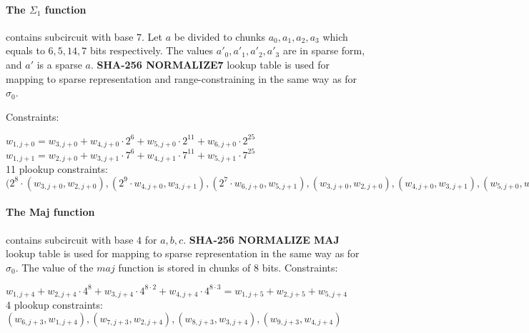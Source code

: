 \paragraph{The $\Sigma_1$ function}
contains subcircuit with base $7$.
Let $a$ be divided to chunks $a_0, a_1, a_2, a_3$ which equals to $6, 5, 14, 7$ bits respectively.
The values $a'_0, a'_1, a'_2, a'_3$ are in sparse form, and $a'$ is a sparse $a$.
\textbf{SHA-256 NORMALIZE7} lookup table is used for mapping to sparse representation and range-constraining in the same way as for $\sigma_0$.

Constraints:
\begin{center}
    $w_{1, j + 0} = w_{3, j + 0} + w_{4, j + 0} \cdot 2^{6} + w_{5, j + 0} \cdot 2^{11} + w_{6, j + 0} \cdot 2^{25}$ \\
    $w_{1, j + 1} = w_{2, j + 0} + w_{3, j + 1} \cdot 7^{6} + w_{4, j + 1} \cdot 7^{11} + w_{5, j + 1} \cdot 7^{25}$ \\
    11 plookup constraints: $(2^8 \cdot (w_{3, j + 0}, w_{2, j + 0}), (2^9 \cdot w_{4, j + 0}, w_{3, j + 1}), (2^7 \cdot w_{6, j + 0}, w_{5, j + 1}), (w_{3,j + 0}, w_{2,j+0}), (w_{4, j + 0}, w_{3, j + 1}), (w_{5, j + 0}, w_{4, j + 1}), (w_{6, j + 0}, w_{5, j + 1}), (w_{6, j + 1}, (w_{3, j + 1} + w_{4, j + 1} + w_{5,j + 1}), (w_{7, j + 1}, (w_{4,j + 1} + w_{5,j + 1} + w_{2, j + 0}, (w_{8, j + 1}, (w_{5,j + 1} + w_{2,j + 0} + w_{3,j + 1}), (w_{9, j + 1}, (w_{2,j + 0} + w_{3,j + 1} + w_{4,j + 1})$ \\
\end{center}

\paragraph{The Maj function}
contains subcircuit with base $4$ for $a, b ,c$.
\textbf{SHA-256 NORMALIZE MAJ} lookup table is used for mapping to sparse representation in the same way as for $\sigma_0$.
The value of the $ maj $ function is stored in chunks of $8$ bits.
Constraints:
\begin{center}
    $w_{1, j + 4} + w_{2, j + 4} \cdot 4^8 + w_{3, j + 4} \cdot 4^{8 \cdot 2} + w_{4, j + 4} \cdot 4^{8 \cdot 3} = w_{1, j + 5} + w_{2, j + 5} + w_{5, j + 4} $ \\
    4 plookup constraints: $( w_{6, j + 3}, w_{1, j + 4}), ( w_{7, j + 3}, w_{2, j + 4}), (w_{8, j + 3}, w_{3, j + 4}), (w_{9, j + 3}, w_{4, j + 4})$ \\
\end{center}

